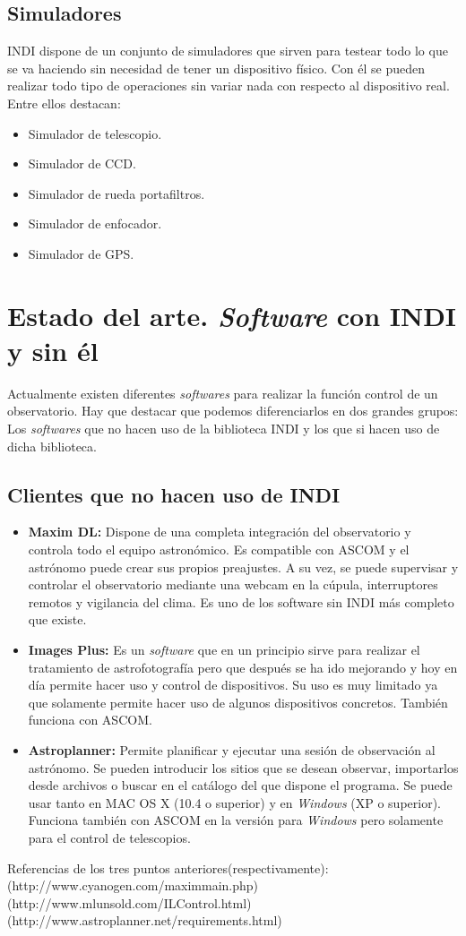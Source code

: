 \subsection{Simuladores}
INDI dispone de un conjunto de simuladores que sirven para testear todo lo que se va haciendo sin necesidad de tener un dispositivo físico. Con él se pueden realizar todo tipo de operaciones sin variar nada con respecto al dispositivo real. Entre ellos destacan:
\begin{itemize}
  \item Simulador de telescopio.
  \item Simulador de CCD.
  \item Simulador de rueda portafiltros.
  \item Simulador de enfocador.
  \item Simulador de GPS.
\end{itemize}

\section{Estado del arte. \textit{Software} con INDI y sin él}
Actualmente existen diferentes \textit{softwares} para realizar la función control de un observatorio. Hay que destacar que podemos diferenciarlos en dos grandes grupos: Los \textit{softwares} que no hacen uso de la biblioteca INDI y los que si hacen uso de dicha biblioteca.

\subsection{Clientes que no hacen uso de INDI}
\begin{itemize}
  \item \textbf{Maxim DL:} Dispone de una completa integración del observatorio y controla todo el equipo astronómico. Es compatible con ASCOM y el astrónomo puede crear sus propios preajustes. A su vez, se puede supervisar y controlar el observatorio mediante una webcam en la cúpula, interruptores remotos y vigilancia del clima. Es uno de los software sin INDI más completo que existe.
  \item \textbf{Images Plus:} Es un \textit{software} que en un principio sirve para realizar el tratamiento de astrofotografía pero que después se ha ido mejorando y hoy en día permite hacer uso y control de dispositivos. Su uso es muy limitado ya que solamente permite hacer uso de algunos dispositivos concretos. También funciona con ASCOM.
  \item \textbf{Astroplanner:} Permite planificar y ejecutar una sesión de observación al astrónomo. Se pueden introducir los sitios que se desean observar, importarlos desde archivos o buscar en el catálogo del que dispone el programa. Se puede usar tanto en MAC OS X (10.4 o superior) y en \textit{Windows} (XP o superior). Funciona también con ASCOM en la versión para \textit{Windows} pero solamente para el control de telescopios.
\end{itemize}
Referencias de los tres puntos anteriores(respectivamente):
(http://www.cyanogen.com/maximmain.php)
(http://www.mlunsold.com/ILControl.html)
(http://www.astroplanner.net/requirements.html)

